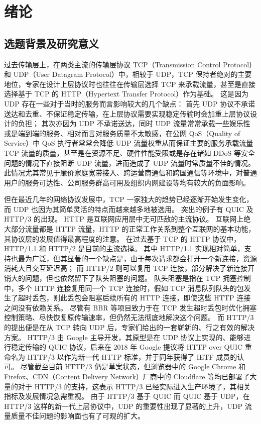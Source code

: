 

\chapter{绪论}

\section{选题背景及研究意义}

过去传输层上，在两类主流的传输层协议 TCP（Transmission Control Protocol）和 UDP（User Datagram Protocol）中，相较于 UDP，TCP 保持者绝对的主要地位，专家在设计上层协议时也往往在传输层选择 TCP 来承载流量，甚至是直接选择基于 TCP 的 HTTP（Hypertext Transfer Protocol）作为基础。
这是因为 UDP 存在一些对于当时的服务而言影响较大的几个缺点：
首先 UDP 协议不承诺送达和去重、不保证稳定传输\cite{rfc768}，在上层协议需要实现稳定传输时会加重上层协议设计的负担；
其次亦因为 UDP 不承诺送达，同时 UDP 流量常常承载一些娱乐性或是端到端的服务、相对而言对服务质量不太敏感\cite{5230775}，在公网 QoS（Quality of Service）中 QoS 执行者常常会降低 UDP 流量权重从而保证主要的服务承载流量 TCP 流量的质量，甚至是在资源不足、硬件性能受限或是存在诸如 DDoS\cite{WOS:000561707700021} 等安全问题的情况下直接阻断 UDP 流量，进而造成了 UDP 流量时常质量不佳的情况。
此情况尤其常见于廉价家庭宽带接入、跨运营商通信和跨国通信等环境中，对普通用户的服务可达性、公司服务群高可用及组织内网建设等均有较大的负面影响。

但在最近几年的网络协议发展中，TCP 一家独大的趋势已经逐渐开始发生变化，而 UDP 也因为其简单灵活的特点而越来越多地被选用。
突出的例子有 QUIC 及 HTTP/3 的出现。
HTTP 是互联网应用层中无可匹敌的主流协议。
互联网上绝大部分流量都是 HTTP 流量，HTTP 的正常工作关系到整个互联网的基本功能，其协议层的发展值得最高程度的注意。
在过去基于 TCP 的 HTTP 协议中，HTTP/1.1 和 HTTP/2 是目前的主流选择。
其中 HTTP/1.1 实现相对简单，支持也最为广泛，但其显著的一个缺点是，由于每次请求都会打开一个新连接，资源消耗大且交互延迟高；
而 HTTP/2 则可以复用 TCP 连接，部分解决了新连接开销大的问题，但也依然留下了队头阻塞的问题。
队头阻塞是指在 TCP 拥塞控制中，多个 HTTP 连接复用同一个 TCP 连接时，假如 TCP 消息队列队头的包发生了超时丢包，则此丢包会阻塞后续所有的 HTTP 连接，即使这些 HTTP 连接之间没有依赖关系。
尽管有 BBR\cite{45646} 等项目致力于在 TCP 发生超时丢包时优化拥塞控制策略、尽快恢复原传输速率，但仍然无法彻底地解决这个问题。
而 HTTP/3 的提出便是在从 TCP 转向 UDP 后，专家们给出的一套崭新的、行之有效的解决方案\cite{7997281}。
HTTP/3 由 Google 主导开发，其原型是在 UDP 协议上实现的、能够进行稳定传输的 QUIC\cite{10.1145/3098822.3098842} 协议，后来在 2018 年 Google 提议将 HTTP over QUIC 重命名为 HTTP/3 以作为新一代 HTTP 标准，并于同年获得了 IETF 成员的认可。
尽管截至目前 HTTP/3 仍是草案状态\cite{ietf-quic-http-34}，但浏览器中的 Google Chrome 和 Firefox、CDN（Content Delivery Network）厂商中的 Cloudflare 等均已部署了大量的对于 HTTP/3 的支持，这表示 HTTP/3 已经实际进入生产环境了，其相关指标及发展情况急需重视。
由于 HTTP/3 基于 QUIC 而 QUIC 基于 UDP，在 HTTP/3 这样的新一代上层协议中，UDP 的重要性出现了显著的上升，UDP 流量质量不佳问题的影响面也有了可观的扩大。

